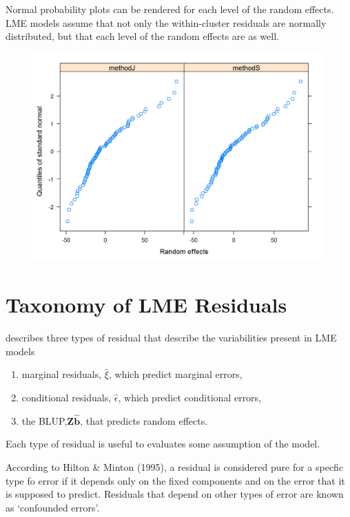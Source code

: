 \documentclass[12pt, a4paper]{report}
\theoremstyle{plain}
\theoremstyle{definition}
\theoremstyle{remark}
\begin{document}
Normal probability plots can be rendered for each level of the random effects.  LME models assume that not only the within-cluster residuals are normally distributed, but that each level of the random effects are as well. %
	\begin{figure}[h!]
		\centering
		\includegraphics[width=0.9\linewidth]{images/ResidPlot2}
		\caption{}
		\label{fig:ResidPlot2}
	\end{figure}	
	
\section*{Taxonomy of LME Residuals}
	
	\citet{pb} describes three types of residual that describe the variabilities
	present in LME models
	\begin{enumerate}
		\item marginal residuals, $\hat{\xi}$, which predict marginal errors,
		\item conditional residuals, $\hat{\epsilon}$, which predict conditional errors,
		\item the BLUP,$\boldsymbol{Z\hat{b}}$, that predicts random effects.
	\end{enumerate}
	Each type of residual is useful to evaluates some assumption of the model.
	
	
	According to Hilton \& Minton (1995), a residual is considered pure for a specfic type fo error
	if it depends only on the fixed components and on the error that it is supposed to predict.
	Residuals that depend on other types of error are known as `confounded errors'.
\end{document}
